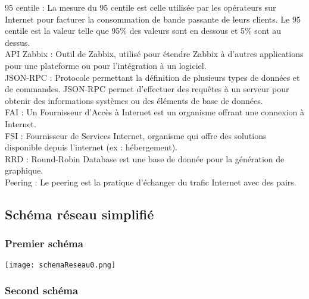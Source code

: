 	95 centile : La mesure du 95 centile est celle utilisée par les opérateurs sur Internet pour facturer la consommation de bande passante de leurs clients. Le 95 centile est la valeur telle que 95\% des valeurs sont en dessous et 5\% sont au dessus.\\

	API Zabbix : Outil de Zabbix, utilisé pour étendre Zabbix à d'autres applications pour une plateforme ou pour l'intégration à un logiciel.\\

	JSON-RPC : Protocole permettant la définition de plusieurs types de données et de commandes. JSON-RPC permet d'effectuer des requêtes à un serveur pour obtenir des informations systèmes ou des éléments de base de données.\\

	FAI : Un Fournisseur d'Accès à Internet est un organisme offrant une connexion à Internet.\\

	FSI : Fournisseur de Services Internet, organisme qui offre des solutions disponible depuis l'internet (ex : hébergement).\\

	RRD : Round-Robin Database est une base de donnée pour la génération de graphique.\\

	Peering : Le peering est la pratique d'échanger du trafic Internet avec des pairs.\\

\newpage

	\subsection{Schéma réseau simplifié}

		\subsubsection{\label{schemaReseau0}Premier schéma}

	\vspace{-0.2cm}	
	\begin{center}
		\texttt{[image: schemaReseau0.png]}
	\end{center}

\newpage
		\subsubsection{\label{schemaReseau1}Second schéma}

